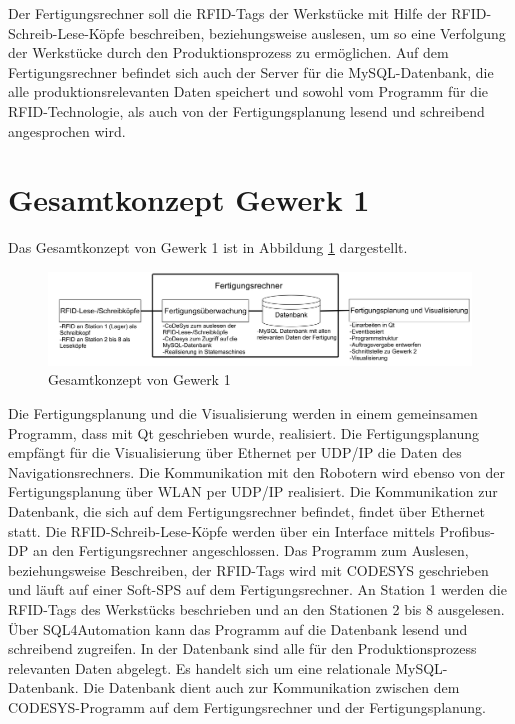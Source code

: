 Der Fertigungsrechner soll die RFID-Tags der Werkstücke mit Hilfe der RFID-Schreib-Lese-Köpfe beschreiben, beziehungsweise auslesen, um so eine Verfolgung der Werkstücke durch den Produktionsprozess zu ermöglichen. Auf dem Fertigungsrechner befindet sich auch der Server für die MySQL-Datenbank, die alle produktionsrelevanten Daten speichert und sowohl vom Programm für die RFID-Technologie, als auch von der Fertigungsplanung lesend und schreibend angesprochen wird.

\section{Gesamtkonzept Gewerk 1}

Das Gesamtkonzept von Gewerk 1 ist in Abbildung \ref{fig:Gesamtkonzept} dargestellt.

\begin{figure}[htb]
	    \centering
	    \includegraphics[width=1\linewidth]{Bilder/Konzept2.png}
        \caption{Gesamtkonzept von Gewerk 1}
        \label{fig:Gesamtkonzept}
\end{figure}

Die Fertigungsplanung und die Visualisierung werden in einem gemeinsamen Programm, dass mit Qt geschrieben wurde, realisiert. Die Fertigungsplanung empfängt für die Visualisierung über Ethernet per UDP/IP die Daten des Navigationsrechners. Die Kommunikation mit den Robotern wird ebenso von der Fertigungsplanung über WLAN per UDP/IP realisiert. Die Kommunikation zur Datenbank, die sich auf dem Fertigungsrechner befindet, findet über Ethernet statt. Die RFID-Schreib-Lese-Köpfe werden über ein Interface mittels Profibus-DP an den Fertigungsrechner angeschlossen. Das Programm zum Auslesen, beziehungsweise Beschreiben, der RFID-Tags wird mit CODESYS geschrieben und läuft auf einer Soft-SPS auf dem Fertigungsrechner. An Station 1 werden die RFID-Tags des Werkstücks beschrieben und an den Stationen 2 bis 8 ausgelesen. Über SQL4Automation kann das Programm auf die Datenbank lesend und schreibend zugreifen. In der Datenbank sind alle für den Produktionsprozess relevanten Daten abgelegt. Es handelt sich um eine relationale MySQL-Datenbank. Die Datenbank dient auch zur Kommunikation zwischen dem CODESYS-Programm auf dem Fertigungsrechner und der Fertigungsplanung. 

